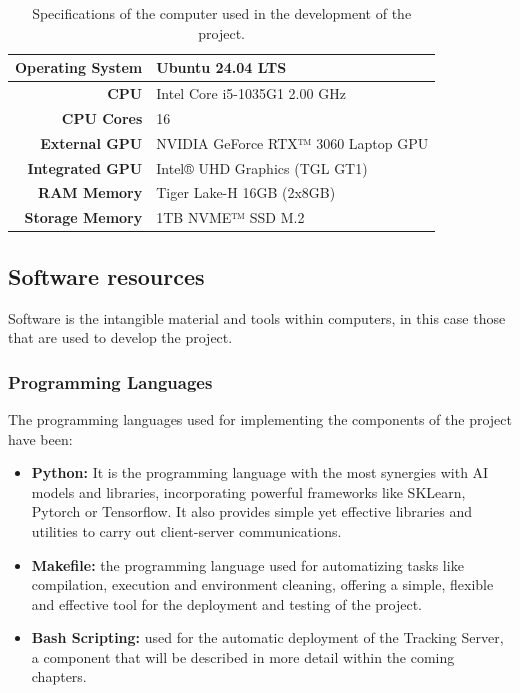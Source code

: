 \begin{table}[H]
    \centering
    \caption{Specifications of the computer used in the development of the project.}
    \label{tab:computerSpecs}
    \begin{tabular}{ | r | l |}
        \hline
        \textbf{Operating System} & Ubuntu 24.04 LTS \\ \hline
        \textbf{CPU} & Intel Core i5-1035G1 2.00 GHz \\ \hline
        \textbf{CPU Cores} & 16 \\ \hline
        \textbf{External GPU} & NVIDIA GeForce RTX™ 3060 Laptop GPU \\ \hline
        \textbf{Integrated GPU} & Intel® UHD Graphics (TGL GT1) \\ \hline
        \textbf{RAM Memory} & Tiger Lake-H 16GB (2x8GB) \\ \hline
        \textbf{Storage Memory} & 1TB NVME™ SSD M.2 \\ \hline
    \end{tabular}
\end{table}

\subsection{Software resources}

Software is the intangible material and tools within computers, in this case those that are used to develop the project.

\subsubsection{Programming Languages}

The programming languages used for implementing the components of the project have been:

\begin{itemize}
    \item \textbf{Python: }It is the programming language with the most synergies with \acrshort{AI} models and libraries, incorporating powerful frameworks like
    SKLearn, Pytorch or Tensorflow. It also provides simple yet effective libraries and utilities to carry out client-server communications.
    \item \textbf{Makefile: }the programming language used for automatizing tasks like compilation, execution and environment cleaning, offering a simple, flexible
    and effective tool for the deployment and testing of the project.
    \item \textbf{Bash Scripting: }used for the automatic deployment of the Tracking Server, a component that will be described in more detail within the coming chapters.
\end{itemize}

